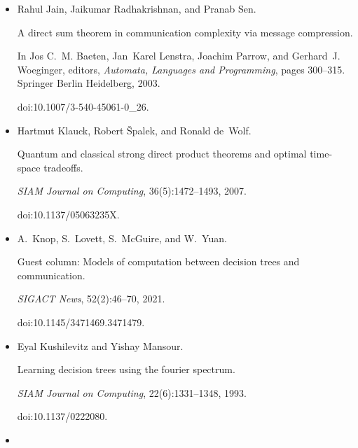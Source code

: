 \begin{itemize}
\emph{Information Processing Letters}, 110(20):893–897, 2010.


doi:10.1016/j.ipl.2010.07.020.





\item[] 
[37]

Rahul Jain, Jaikumar Radhakrishnan, and Pranab Sen.


A direct sum theorem in communication complexity via message
compression.


In Jos C. M. Baeten, Jan Karel Lenstra, Joachim Parrow, and
Gerhard J. Woeginger, editors, \emph{Automata, Languages and Programming},
pages 300–315. Springer Berlin Heidelberg, 2003.


doi:10.1007/3-540-45061-0\_26.





\item[] 
[38]

Hartmut Klauck, Robert Špalek, and Ronald de Wolf.


Quantum and classical strong direct product theorems and optimal
time-space tradeoffs.


\emph{SIAM Journal on Computing}, 36(5):1472–1493, 2007.


doi:10.1137/05063235X.





\item[] 
[39]

A. Knop, S. Lovett, S. McGuire, and W. Yuan.


Guest column: Models of computation between decision trees and
communication.


\emph{SIGACT News}, 52(2):46–70, 2021.


doi:10.1145/3471469.3471479.





\item[] 
[40]

Eyal Kushilevitz and Yishay Mansour.


Learning decision trees using the fourier spectrum.


\emph{SIAM Journal on Computing}, 22(6):1331–1348, 1993.


doi:10.1137/0222080.





\item[] 
[41]


\end{itemize}
